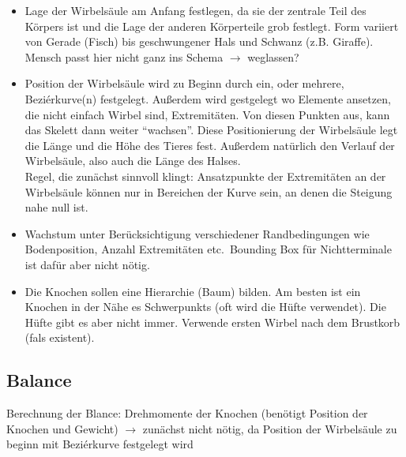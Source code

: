 \begin{itemize}

\item Lage der Wirbelsäule am Anfang festlegen, da sie der zentrale Teil des Körpers ist und die Lage der anderen Körperteile grob festlegt. Form variiert von Gerade (Fisch) bis geschwungener Hals und Schwanz (z.B. Giraffe). Mensch passt hier nicht ganz ins Schema $\rightarrow$ weglassen?
  
\item Position der Wirbelsäule wird zu Beginn durch ein, oder mehrere, Beziérkurve(n) festgelegt. Außerdem wird gestgelegt wo Elemente ansetzen, die nicht einfach Wirbel sind, \zb Extremitäten. Von diesen Punkten aus, kann das Skelett dann weiter "`wachsen"'. Diese Positionierung der Wirbelsäule legt die Länge und die Höhe des Tieres fest. Außerdem natürlich den Verlauf der Wirbelsäule, also \zb auch die Länge des Halses.\\
Regel, die zunächst sinnvoll klingt: Ansatzpunkte der Extremitäten an der Wirbelsäule können nur in Bereichen der Kurve sein, an denen die Steigung nahe null ist.

\item Wachstum unter Berücksichtigung verschiedener Randbedingungen wie Bodenposition, Anzahl Extremitäten etc.\ Bounding Box für Nichtterminale ist dafür aber nicht nötig.
  
\item Die Knochen sollen eine Hierarchie (Baum) bilden. Am besten ist ein Knochen in der Nähe es Schwerpunkts (oft wird die Hüfte verwendet). Die Hüfte gibt es aber nicht immer. Verwende ersten Wirbel nach dem Brustkorb (fals existent).
\end{itemize}

 
\subsection{Balance} 

Berechnung der Blance: Drehmomente der Knochen (benötigt Position der Knochen und Gewicht) $\rightarrow$ zunächst nicht nötig, da Position  der Wirbelsäule zu beginn mit Beziérkurve festgelegt wird

